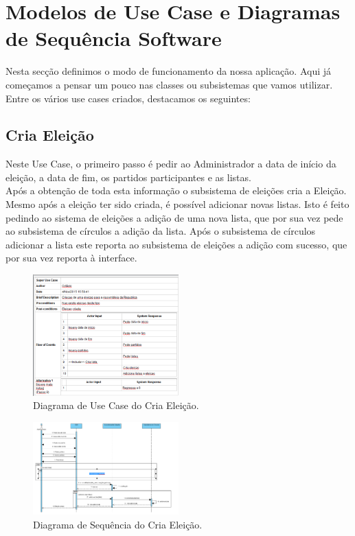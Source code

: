 \documentclass[a4paper,12pt]{report}
\begin{document}
\clearpage
\section{Modelos de Use Case e Diagramas de Sequência Software}
Nesta secção definimos o modo de funcionamento da nossa aplicação. Aqui já começamos a pensar um pouco nas classes ou subsistemas que vamos utilizar.
Entre os vários use cases criados, destacamos os seguintes:

\subsection{Cria Eleição}
Neste Use Case, o primeiro passo é pedir ao Administrador a data de início da eleição, a data de fim, os partidos participantes e as listas.
\\\indent Após a obtenção de toda esta informação o subsistema de eleições cria a Eleição.
\\\indent Mesmo após a eleição ter sido criada, é possível adicionar novas listas. Isto é feito pedindo ao sistema de eleições a adição de uma nova lista, que por sua vez pede ao subsistema de círculos a adição da lista. Após o subsistema de círculos adicionar a lista este reporta ao subsistema de eleições a adição com sucesso, que por sua vez reporta à interface.

\begin{figure}[h]
\begin{center}
	\includegraphics[width=0.5\textwidth]{media/usecase_dss/uc_criaEleicao.PNG}
	 \caption{Diagrama de Use Case do Cria Eleição.}
\end{center}
\end{figure}

\begin{figure}[h]
\begin{center}
	\includegraphics[width=0.5\textwidth]{media/usecase_dss/CriaEleicao.png}
	 \caption{Diagrama de Sequência do Cria Eleição.}
\end{center}
\end{figure}
\end{document}

